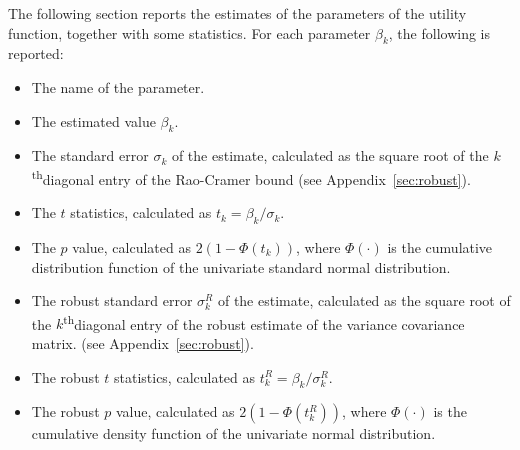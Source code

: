 \documentclass[12pt,a4paper]{article}
\renewcommand{\th}{\textsuperscript{th}}
\begin{document}
The following section reports the estimates of the parameters of the
utility function,
together with some statistics. For each parameter $\beta_k$, the following is reported:
   \begin{itemize}
  \item The name of the parameter.
      \item The estimated value $\beta_k$. 
      \item The standard error $\sigma_k$ of the estimate, calculated as the
         square root of the $k$\th diagonal entry of the
         Rao-Cramer bound (see Appendix~\ref{sec:robust}).
     \item The $t$ statistics, calculated as $t_k=\beta_k/\sigma_k$.
     \item The $p$ value, calculated as $2 (1 - \Phi(t_k))$,
where $\Phi(\cdot)$ is the cumulative distribution function of the
univariate standard normal distribution. 
      \item The robust standard error $\sigma^R_k$ of the estimate, calculated as the
         square root of the $k$\th diagonal entry of the
         robust estimate of the variance covariance matrix. (see Appendix~\ref{sec:robust}).
     \item The robust $t$ statistics, calculated as $t^R_k=\beta_k/\sigma^R_k$.
     \item The robust $p$ value, calculated as $2 (1 - \Phi(t^R_k))$,
where $\Phi(\cdot)$ is the cumulative density function of the
univariate normal distribution. 
   \end{itemize}
\end{document}
